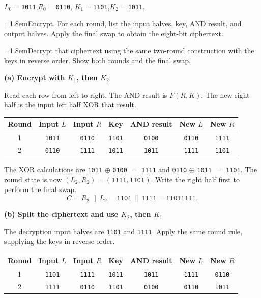 \documentclass[11pt,a4paper]{article}
\newif\ifshowsolutions
\newcommand{\task}[2]{\par\noindent\hangindent=1.8em\hangafter=1\makebox[1.8em][l]{\bfseries\color{teal}(#1)}#2\par}
\newcommand{\solution}{\par\vspace{1.5cm}{\color{teal}\large\bfseries Worked solution}\par\vspace{2pt}}
\newcommand{\step}[2]{\par\textbf{(#1) #2}\par}
\newcommand{\bits}[1]{\texttt{#1}}
\begin{document}
\begin{data}
$L_0=$\bits{1011},\quad $R_0=$\bits{0110},\qquad
$K_1=$\bits{1101},\quad $K_2=$\bits{1011}.
\end{data}

\task{a}{Encrypt. For each round, list the input halves, key, AND result, and output halves. Apply the final swap to obtain the eight-bit ciphertext.}
\task{b}{Decrypt that ciphertext using the same two-round construction with the keys in reverse order. Show both rounds and the final swap.}

\ifshowsolutions
\solution
\step{a}{Encrypt with $K_1$, then $K_2$}
Read each row from left to right. The AND result is $F(R,K)$. The new right
half is the input left half XOR that result.

\begin{center}
\begin{tabular}{ccccccc}
\toprule
Round & Input $L$ & Input $R$ & Key & AND result & New $L$ & New $R$ \\
\midrule
1 & \bits{1011} & \bits{0110} & \bits{1101} & \bits{0100} & \bits{0110} & \bits{1111} \\
2 & \bits{0110} & \bits{1111} & \bits{1011} & \bits{1011} & \bits{1111} & \bits{1101} \\
\bottomrule
\end{tabular}
\end{center}

The XOR calculations are \bits{1011} $\oplus$ \bits{0100} $=$ \bits{1111}
and \bits{0110} $\oplus$ \bits{1011} $=$ \bits{1101}.
The round state is now $(L_2,R_2)=(\bits{1111},\bits{1101})$.
Write the right half first to perform the final swap.
\[
 C=R_2\,\|\,L_2=\bits{1101}\,\|\,\bits{1111}=\bits{11011111}.
\]

\step{b}{Split the ciphertext and use $K_2$, then $K_1$}
The decryption input halves are \bits{1101} and \bits{1111}.
Apply the same round rule, supplying the keys in reverse order.

\begin{center}
\begin{tabular}{ccccccc}
\toprule
Round & Input $L$ & Input $R$ & Key & AND result & New $L$ & New $R$ \\
\midrule
1 & \bits{1101} & \bits{1111} & \bits{1011} & \bits{1011} & \bits{1111} & \bits{0110} \\
2 & \bits{1111} & \bits{0110} & \bits{1101} & \bits{0100} & \bits{0110} & \bits{1011} \\
\bottomrule
\end{tabular}
\end{center}
\end{document}
